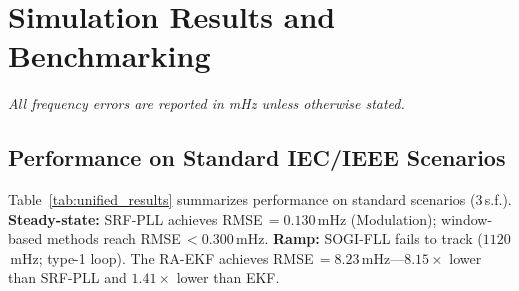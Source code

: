 \section{Simulation Results and Benchmarking}
\label{sec:results}

\emph{All frequency errors are reported in mHz unless otherwise stated.}

\subsection{Performance on Standard IEC/IEEE Scenarios}

Table~\ref{tab:unified_results} summarizes performance on standard scenarios (3\,s.f.).
\textbf{Steady-state:} SRF-PLL achieves RMSE\,$=0.130$\,mHz (Modulation);
window-based methods reach RMSE\,$<0.300$\,mHz.
\textbf{Ramp:} SOGI-FLL fails to track ($1120$\,mHz; type-1 loop).
The RA-EKF achieves RMSE\,$=\mathbf{8.23}$\,mHz---$8.15\!\times$ lower
than SRF-PLL and $1.41\!\times$ lower than EKF.


